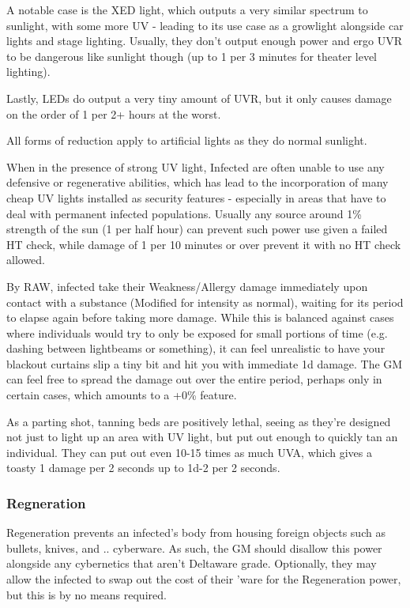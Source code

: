 \begin{multicols*}{3}
	A notable case is the XED light, which outputs a very similar spectrum to sunlight, with some more UV - leading to its use case as a growlight alongside car lights and stage lighting. Usually, they don't output enough power and ergo UVR to be dangerous like sunlight though (up to 1 per 3 minutes for theater level lighting).
	
	Lastly, LEDs do output a very tiny amount of UVR, but it only causes damage on the order of 1 per 2+ hours at the worst.
	
	All forms of reduction apply to artificial lights as they do normal sunlight.
	
	When in the presence of strong UV light, Infected are often unable to use any defensive or regenerative abilities, which has lead to the incorporation of many cheap UV lights installed as security features - especially in areas that have to deal with permanent infected populations. Usually any source around 1\% strength of the sun (1 per half hour) can prevent such power use given a failed HT check, while damage of 1 per 10 minutes or over prevent it with no HT check allowed.
	
	By RAW, infected take their Weakness/Allergy damage immediately upon contact with a substance (Modified for intensity as normal), waiting for its period to elapse again before taking more damage. While this is balanced against cases where individuals would try to only be exposed for small portions of time (e.g. dashing between lightbeams or something), it can feel unrealistic to have your blackout curtains slip a tiny bit and hit you with immediate 1d damage. The GM can feel free to spread the damage out over the entire period, perhaps only in certain cases, which amounts to a +0\% feature.
	
	As a parting shot, tanning beds are positively lethal, seeing as they're designed not just to light up an area with UV light, but put out enough to quickly tan an individual. They can put out even 10-15 times as much UVA, which gives a toasty 1 damage per 2 seconds up to 1d-2 per 2 seconds.
	
	\subsubsection{Regneration}
	
	Regeneration prevents an infected's body from housing foreign objects such as bullets, knives, and .. cyberware. As such, the GM should disallow this power alongside any cybernetics that aren't Deltaware grade. Optionally, they may allow the infected to swap out the cost of their 'ware for the Regeneration power, but this is by no means required.
	

\end{multicols*}
